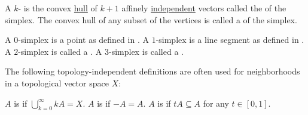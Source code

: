 \begin{definition}\label{def:simplex}
  A \( k \)- is the convex \hyperref[def:convex_set/hull]{hull} of \( k + 1 \) affinely \hyperref[affine_independence]{independent} vectors called the  of the simplex. The convex hull of any subset of the vertices is called a  of the simplex.

  \begin{defenum}
     A \( 0 \)-simplex is a point as defined in .
     A \( 1 \)-simplex is a line segment as defined in .
     A \( 2 \)-simplex is called a .
     A \( 3 \)-simplex is called a .
  \end{defenum}
\end{definition}

\begin{definition}\label{def:neighborhood_set_types}
  The following topology-independent definitions are often used for neighborhoods in a topological vector space \( X \):

  \begin{defenum}
     \( A \) is  if \( \bigcup_{k=0}^\infty kA = X \).
     \( A \) is  if \( -A = A \).
     \( A \) is  if \( tA \subseteq A \) for any \( t \in [0, 1] \).
  \end{defenum}
\end{definition}
